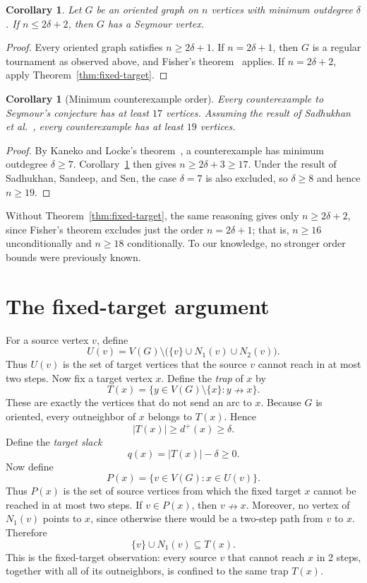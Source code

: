 \documentclass[10pt,a4paper]{amsart}
\newtheorem{corollary}[theorem]{Corollary}
\begin{document}
\begin{corollary}\label{cor:dense-case}
Let $G$ be an oriented graph on $n$ vertices with minimum outdegree $\delta$.
If $n\le2\delta+2$, then $G$ has a Seymour vertex.
\end{corollary}

\begin{proof}
Every oriented graph satisfies $n\ge2\delta+1$.  If $n=2\delta+1$, then $G$
is a regular tournament as observed above, and Fisher's
theorem~\cite{Fisher1996} applies.  If $n=2\delta+2$, apply
Theorem~\ref{thm:fixed-target}.
\end{proof}

\begin{corollary}[Minimum counterexample order]\label{cor:counterexample-order}
Every counterexample to Seymour's conjecture has at least $17$ vertices.
Assuming the result of Sadhukhan et al.~\cite{SadhukhanSandeepSen2026}, every
counterexample has at least $19$ vertices.
\end{corollary}

\begin{proof}
By Kaneko and Locke's theorem~\cite{KanekoLocke2001}, a counterexample has
minimum outdegree $\delta\ge7$.  Corollary~\ref{cor:dense-case} then gives
$n\ge2\delta+3\ge17$.  Under the result of Sadhukhan, Sandeep, and Sen, the
case $\delta=7$ is also excluded, so $\delta\ge8$ and hence $n\ge19$.
\end{proof}

Without Theorem~\ref{thm:fixed-target}, the same reasoning gives only
$n\ge2\delta+2$, since Fisher's theorem excludes just the order $n=2\delta+1$;
that is, $n\ge16$ unconditionally and $n\ge18$ conditionally.  To our
knowledge, no stronger order bounds were previously known.

\section{The fixed-target argument}

For a source vertex $v$, define
\[
 U(v)=V(G)\setminus\bigl(\{v\}\cup N_1(v)\cup N_2(v)\bigr).
\]
Thus $U(v)$ is the set of target vertices that the source $v$ cannot reach in
at most two steps. Now fix a target vertex $x$.  Define the \emph{trap} of $x$ by
\[
 T(x)=\{y\in V(G)\setminus\{x\}:y\nrightarrow x\}.
\]
These are exactly the vertices that do not send an arc to $x$.  Because $G$
is oriented, every outneighbor of $x$ belongs to $T(x)$.  Hence
\[
 |T(x)|\ge d^+(x)\ge\delta.
\]
Define the \emph{target slack}
\[
 q(x)=|T(x)|-\delta\ge0.
\]
Now define
\[
 P(x)=\{v\in V(G):x\in U(v)\}.
\]
Thus $P(x)$ is the set of source vertices from which the fixed target $x$
cannot be reached in at most two steps.  If $v\in P(x)$, then $v\nrightarrow
x$.  Moreover, no vertex of $N_1(v)$ points to $x$, since otherwise there
would be a two-step path from $v$ to $x$.  Therefore
\begin{equation}\label{eq:trap}
 \{v\}\cup N_1(v)\subseteq T(x).
\end{equation}
This is the fixed-target observation: every source $v$ that cannot reach $x$ in 2 steps, together with
all of its outneighbors, is confined to the same trap $T(x)$.
\end{document}
